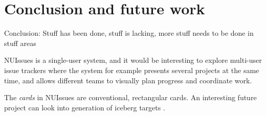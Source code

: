 \section{Conclusion and future work}

Conclusion: Stuff has been done, stuff is lacking, more stuff needs to be done in stuff areas

NUIssues is a single-user system, and it would be interesting to explore multi-user issue trackers where the system for example presents several projects at the same time, and allows different teams to visually plan progress and coordinate work.

The \textit{cards} in NUIssues are conventional, rectangular cards. An interesting future project can look into generation of iceberg targets \autocite[91]{wigdow-wixon:brave-nui-world:2011}.
